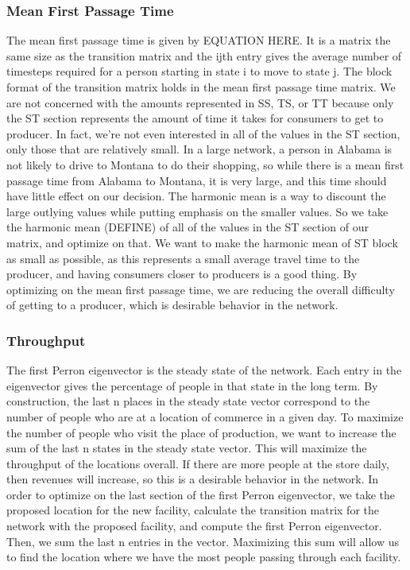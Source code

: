 \documentclass[twoside,twocolumn]{article}
\begin{document}

\subsubsection{Mean First Passage Time}
The mean first passage time is given by EQUATION HERE.
It is a matrix the same size as the transition matrix and the ijth entry gives the average number of timesteps required for a person starting in state i to move to state j.
The block format of the transition matrix holds in the mean first passage time matrix.
We are not concerned with the amounts represented in SS, TS, or TT because only the ST section represents the amount of time it takes for consumers to get to producer.
In fact, we're not even interested in all of the values in the ST section, only those that are relatively small.
In a large network, a person in Alabama is not likely to drive to Montana to do their shopping, so while there is a mean first passage time from Alabama to Montana, it is very large, and this time should have little effect on our decision.
The harmonic mean is a way to discount the large outlying values while putting emphasis on the smaller values.
So we take the harmonic mean (DEFINE) of all of the values in the ST section of our matrix, and optimize on that.
We want to make the harmonic mean of ST block as small as possible, as this represents a small average travel time to the producer, and having consumers closer to producers is a good thing.
By optimizing on the mean first passage time, we are reducing the overall difficulty of getting to a producer, which is desirable behavior in the network.

\subsubsection{Throughput}
The first Perron eigenvector is the steady state of the network. %
Each entry in the eigenvector gives the percentage of people in that state in the long term. %
By construction, the last n places in the steady state vector correspond to the number of people who are at a location of commerce in a given day.
To maximize the number of people who visit the place of production, we want to increase the sum of the last n states in the steady state vector.
This will maximize the throughput of the locations overall.
If there are more people at the store daily, then revenues will increase, so this is a desirable behavior in the network.
In order to optimize on the last section of the first Perron eigenvector, we take the proposed location for the new facility, calculate the transition matrix for the network with the proposed facility, and compute the first Perron eigenvector.
Then, we sum the last n entries in the vector.
Maximizing this sum will allow us to find the location where we have the most people passing through each facility.
\end{document}

